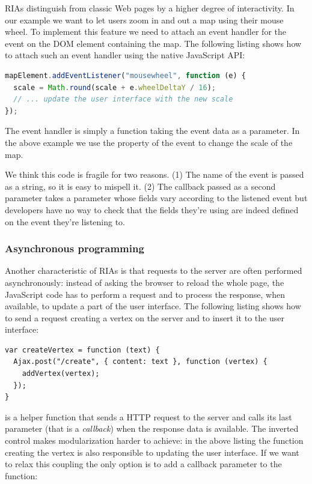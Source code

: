 \documentclass[american,english,runningheads]{llncs}
\begin{document}
RIAs distinguish from classic Web pages by a higher degree of interactivity. In our example we want to let users zoom in and out a map using their mouse wheel. To implement this feature we need to attach an event handler for the  event on the DOM element containing the map. The following listing shows how to attach such an event handler using the native JavaScript API:

\begin{lstlisting}[language=JavaScript,label=event-js,caption=Native JavaScript API to handle events]
mapElement.addEventListener("mousewheel", function (e) {
  scale = Math.round(scale + e.wheelDeltaY / 16);
  // ... update the user interface with the new scale
});
\end{lstlisting}

The event handler is simply a function taking the event data as a parameter. In the above example we use the  property of the event to change the scale of the map.

We think this code is fragile for two reasons. (1) The name of the event is passed as a string, so it is easy to mispell it. (2) The callback passed as a second parameter takes a parameter  whose fields vary according to the listened event but developers have no way to check that the fields they’re using are indeed defined on the event they’re listening to.

\subsubsection{Asynchronous programming}

Another characteristic of RIAs is that requests to the server are often performed asynchronously: instead of asking the browser to reload the whole page, the JavaScript code has to perform a request and to process the response, when available, to update a part of the user interface. The following listing shows how to send a request creating a vertex on the server and to insert it to the user interface:

\begin{lstlisting}
var createVertex = function (text) {
  Ajax.post("/create", { content: text }, function (vertex) {
    addVertex(vertex);
  });
}
\end{lstlisting}

 is a helper function that sends a HTTP request to the server and calls its last parameter (that is a \emph{callback}) when the response data is available. The inverted control makes modularization harder to achieve: in the above listing the function creating the vertex is also responsible to updating the user interface. If we want to relax this coupling the only option is to add a callback parameter to the  function:
\end{document}
